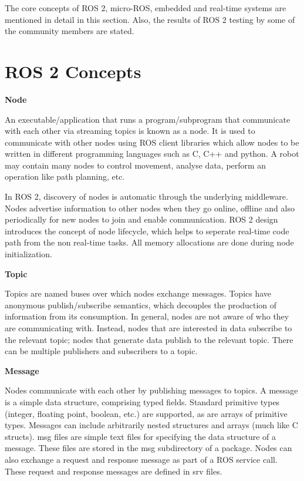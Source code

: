 \documentclass[%
xelatex,
	oneside,		%
	12pt,			%
	parskip=half,	%
	abstracton,
	chapterprefix=true%
    appendixprefix=true]
{scrbook}
\begin{document}
The core concepts of ROS 2, micro-ROS, embedded and real-time systems are mentioned in detail in this section. Also, the results of ROS 2 testing by some of the community members are stated.
	\section{ROS 2 Concepts}
	
	\vspace*{0.5cm}
	{\bfseries Node}
	
	
	\vspace*{0.5cm}
An executable/application that runs a program/subprogram that communicate with each other via streaming topics is known as a node.
It is used to communicate with other nodes using ROS client libraries which allow nodes to be written in different programming languages such as C, C++ and python. A robot may contain many nodes to control movement, analyse data, perform an operation like path planning, etc. 

In ROS 2, discovery of nodes is automatic through the underlying middleware. Nodes advertise information to other nodes when they go online, offline and also periodically for new nodes to join and enable communication. ROS 2 design introduces the concept of node lifecycle, which helps to seperate real-time code path from the non real-time tasks. All memory allocations are done during node initialization.


\vspace*{0.5cm}
	{\bfseries Topic}
	
	
	\vspace*{0.5cm}
	Topics are named buses over which nodes exchange messages. Topics have anonymous publish/subscribe semantics, which decouples the production of information from its consumption. In general, nodes are not aware of who they are communicating with. Instead, nodes that are interested in data subscribe to the relevant topic; nodes that generate data publish to the relevant topic. There can be multiple publishers and subscribers to a topic.\cite{topic}
	
	\vspace*{0.5cm}
	{\bfseries Message}
	
	
	\vspace*{0.5cm}
	Nodes communicate with each other by publishing messages to topics. A message is a simple data structure, comprising typed fields. Standard primitive types (integer, floating point, boolean, etc.) are supported, as are arrays of primitive types. Messages can include arbitrarily nested structures and arrays (much like C structs). msg files are simple text files for specifying the data structure of a message. These files are stored in the msg subdirectory of a package. Nodes can also exchange a request and response message as part of a ROS service call. These request and response messages are defined in srv files.\cite{messages}
	
\end{document}
